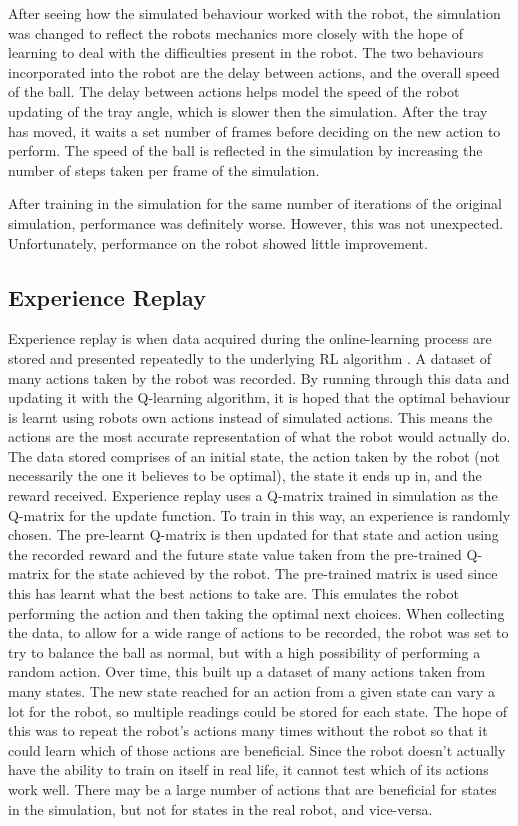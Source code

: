 \documentclass[12pt,a4paper]{article}
\begin{document}
After seeing how the simulated behaviour worked with the robot, the simulation was changed to reflect the robots mechanics more closely with the hope of learning to deal with the difficulties present in the robot. The two behaviours incorporated into the robot are the delay between actions, and the overall speed of the ball. The delay between actions helps model the speed of the robot updating of the tray angle, which is slower then the simulation. After the tray has moved, it waits a set number of frames before deciding on the new action to perform. The speed of the ball is reflected in the simulation by increasing the number of steps taken per frame of the simulation. 

After training in the simulation for the same number of iterations of the original simulation, performance was definitely worse. However, this was not unexpected. Unfortunately, performance on the robot showed little improvement. 

\subsection{Experience Replay}
Experience replay is when data acquired during the online-learning process are stored and presented repeatedly to the underlying RL algorithm \cite{er}. A dataset of many actions taken by the robot was recorded. By running through this data and updating it with the Q-learning algorithm, it is hoped that the optimal behaviour is learnt using robots own actions instead of simulated actions. This means the actions are the most accurate representation of what the robot would actually do. The data stored comprises of an initial state, the action taken by the robot (not necessarily the one it believes to be optimal), the state it ends up in, and the reward received. Experience replay uses a Q-matrix trained in simulation as the Q-matrix for the update function. To train in this way, an experience is randomly chosen. The pre-learnt Q-matrix is then updated for that state and action using the recorded reward and the future state value taken from the pre-trained Q-matrix for the state achieved by the robot. The pre-trained matrix is used since this has learnt what the best actions to take are. This emulates the robot performing the action and then taking the optimal next choices. When collecting the data, to allow for a wide range of actions to be recorded, the robot was set to try to balance the ball as normal, but with a high possibility of performing a random action. Over time, this built up a dataset of many actions taken from many states. The new state reached for an action from a given state can vary a lot for the robot, so multiple readings could be stored for each state. The hope of this was to repeat the robot's actions many times without the robot so that it could learn which of those actions are beneficial. Since the robot doesn't actually have the ability to train on itself in real life, it cannot test which of its actions work well. There may be a large number of actions that are beneficial for states in the simulation, but not for states in the real robot, and vice-versa. 
\end{document}
